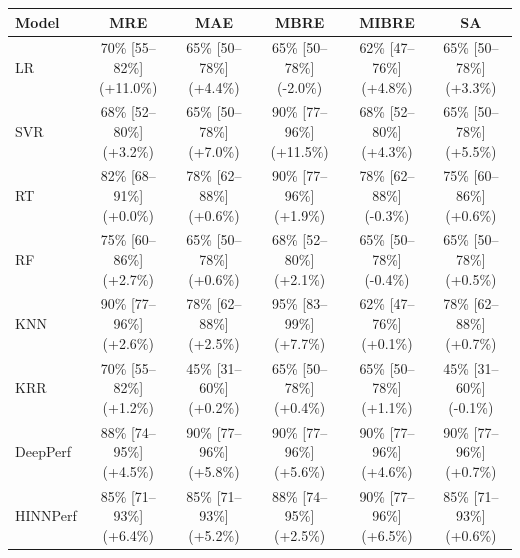 \begin{tabular}{lccccc}
\toprule
Model & MRE & MAE & MBRE & MIBRE & SA \\
\midrule
LR & 70\% [55--82\%] (+11.0\%) & 65\% [50--78\%] (+4.4\%) & 65\% [50--78\%] (-2.0\%) & 62\% [47--76\%] (+4.8\%) & 65\% [50--78\%] (+3.3\%) \\
SVR & 68\% [52--80\%] (+3.2\%) & 65\% [50--78\%] (+7.0\%) & 90\% [77--96\%] (+11.5\%) & 68\% [52--80\%] (+4.3\%) & 65\% [50--78\%] (+5.5\%) \\
RT & 82\% [68--91\%] (+0.0\%) & 78\% [62--88\%] (+0.6\%) & 90\% [77--96\%] (+1.9\%) & 78\% [62--88\%] (-0.3\%) & 75\% [60--86\%] (+0.6\%) \\
RF & 75\% [60--86\%] (+2.7\%) & 65\% [50--78\%] (+0.6\%) & 68\% [52--80\%] (+2.1\%) & 65\% [50--78\%] (-0.4\%) & 65\% [50--78\%] (+0.5\%) \\
KNN & 90\% [77--96\%] (+2.6\%) & 78\% [62--88\%] (+2.5\%) & 95\% [83--99\%] (+7.7\%) & 62\% [47--76\%] (+0.1\%) & 78\% [62--88\%] (+0.7\%) \\
KRR & 70\% [55--82\%] (+1.2\%) & 45\% [31--60\%] (+0.2\%) & 65\% [50--78\%] (+0.4\%) & 65\% [50--78\%] (+1.1\%) & 45\% [31--60\%] (-0.1\%) \\
DeepPerf & 88\% [74--95\%] (+4.5\%) & 90\% [77--96\%] (+5.8\%) & 90\% [77--96\%] (+5.6\%) & 90\% [77--96\%] (+4.6\%) & 90\% [77--96\%] (+0.7\%) \\
HINNPerf & 85\% [71--93\%] (+6.4\%) & 85\% [71--93\%] (+5.2\%) & 88\% [74--95\%] (+2.5\%) & 90\% [77--96\%] (+6.5\%) & 85\% [71--93\%] (+0.6\%) \\
\bottomrule
\end{tabular}
